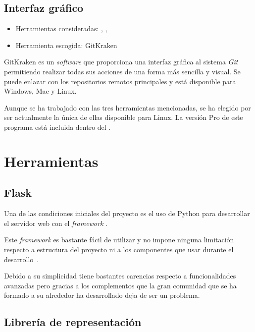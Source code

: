 \subsection{Interfaz gráfico}

\begin{itemize}
	\tightlist
	\item Herramientas consideradas:
	,
	,
	\item Herramienta escogida: GitKraken
\end{itemize}

GitKraken es un \textit{software} que proporciona una interfaz gráfica al
sistema \textit{Git} permitiendo realizar todas sus acciones de una forma más
sencilla y visual. Se puede enlazar con los repositorios remotos principales y
está disponible para Windows, Mac y Linux.

Aunque se ha trabajado con las tres herramientas mencionadas, se ha elegido por
ser actualmente la única de ellas disponible para Linux. La versión Pro de este programa está incluida dentro del .

\section{Herramientas}

\subsection{Flask}

Una de las condiciones iniciales del proyecto es el uso de Python para desarrollar el servidor web con el \textit{framework} .

Este \textit{framework} es bastante fácil de utilizar y no impone ninguna limitación respecto a estructura del proyecto ni a los componentes que usar durante el desarrollo~\cite{grinberg2014flask}.

Debido a su simplicidad tiene bastantes carencias respecto a funcionalidades avanzadas pero gracias a los complementos que la gran comunidad que se ha formado a su alrededor ha desarrollado deja de ser un problema.

\subsection{Librería de representación}

